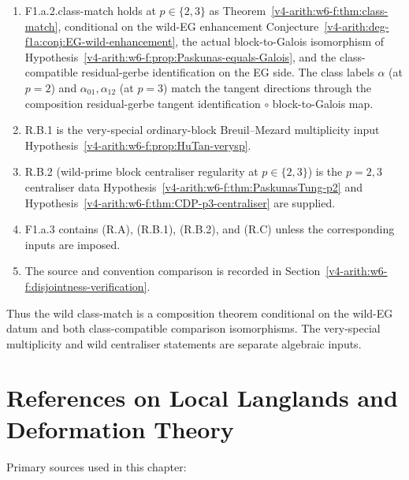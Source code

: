 \begin{enumerate}
\item F1.a.2.class-match holds at \(p\in\{2,3\}\) as
Theorem~\ref{v4-arith:w6-f:thm:class-match}, conditional on the
wild-EG enhancement Conjecture~\ref{v4-arith:deg-f1a:conj:EG-wild-enhancement},
the actual block-to-Galois isomorphism of
Hypothesis~\ref{v4-arith:w6-f:prop:Paskunas-equals-Galois}, and the
class-compatible residual-gerbe identification on the EG side. The class labels \(\alpha\) (at \(p=2\)) and
\(\alpha_{01},\alpha_{12}\) (at \(p=3\)) match the tangent
directions through the composition
residual-gerbe tangent identification \(\circ\) block-to-Galois map.
\item R.B.1 is the very-special ordinary-block Breuil--Mezard
multiplicity input Hypothesis~\ref{v4-arith:w6-f:prop:HuTan-verysp}.
\item R.B.2 (wild-prime block centraliser regularity at \(p\in\{2,3\}\))
is the \(p=2,3\) centraliser data
Hypothesis~\ref{v4-arith:w6-f:thm:PaskunasTung-p2} and
Hypothesis~\ref{v4-arith:w6-f:thm:CDP-p3-centraliser} are supplied.
\item F1.a.3 contains (R.A), (R.B.1), (R.B.2), and (R.C) unless the
corresponding inputs are imposed.
\item The source and convention comparison is recorded in
Section~\ref{v4-arith:w6-f:disjointness-verification}.
\end{enumerate}

Thus the wild class-match is a composition theorem conditional on
the wild-EG datum and both class-compatible comparison isomorphisms. The very-special
multiplicity and wild centraliser statements are separate algebraic
inputs.

\section{References on Local Langlands and Deformation Theory}
\label{v4-arith:w6-f:bibliography}

Primary sources used in this chapter:

